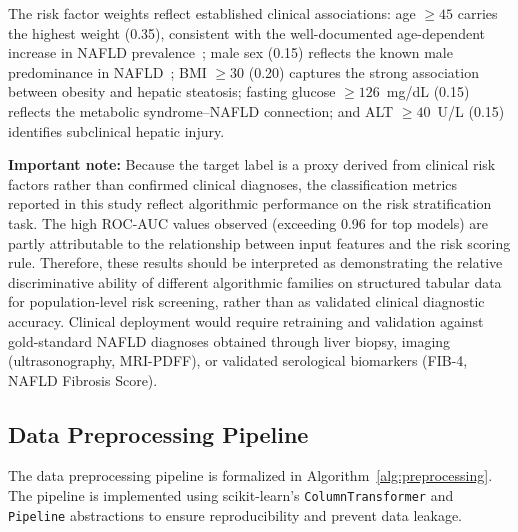 \documentclass[conference,10pt]{IEEEtran}
\begin{document}
The risk factor weights reflect established clinical associations: age $\geq 45$ carries the highest weight (0.35), consistent with the well-documented age-dependent increase in NAFLD prevalence~\cite{younossi2016global}; male sex (0.15) reflects the known male predominance in NAFLD~\cite{chalasani2018diagnosis}; BMI $\geq 30$ (0.20) captures the strong association between obesity and hepatic steatosis; fasting glucose $\geq 126$~mg/dL (0.15) reflects the metabolic syndrome--NAFLD connection; and ALT $\geq 40$~U/L (0.15) identifies subclinical hepatic injury.

\textbf{Important note:} Because the target label is a proxy derived from clinical risk factors rather than confirmed clinical diagnoses, the classification metrics reported in this study reflect algorithmic performance on the risk stratification task. The high ROC-AUC values observed (exceeding 0.96 for top models) are partly attributable to the relationship between input features and the risk scoring rule. Therefore, these results should be interpreted as demonstrating the relative discriminative ability of different algorithmic families on structured tabular data for population-level risk screening, rather than as validated clinical diagnostic accuracy. Clinical deployment would require retraining and validation against gold-standard NAFLD diagnoses obtained through liver biopsy, imaging (ultrasonography, MRI-PDFF), or validated serological biomarkers (FIB-4, NAFLD Fibrosis Score).

\subsection{Data Preprocessing Pipeline}
\label{subsec:preprocessing}

The data preprocessing pipeline is formalized in Algorithm~\ref{alg:preprocessing}. The pipeline is implemented using scikit-learn's \texttt{ColumnTransformer} and \texttt{Pipeline} abstractions to ensure reproducibility and prevent data leakage.
\end{document}
